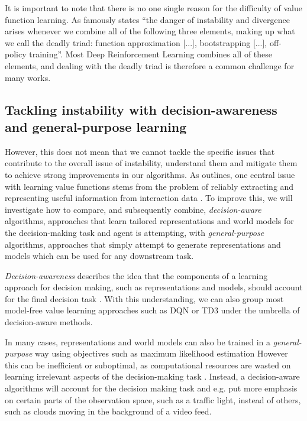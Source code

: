 It is important to note that there is no one single reason for the difficulty of value function learning.
As \textcite{suttonbook} famously states ``the danger of instability and divergence arises whenever we combine all of the following three elements, making up what we call the deadly triad: function approximation [...], bootstrapping [...], off-policy training''.
Most Deep Reinforcement Learning combines all of these elements, and dealing with the deadly triad is therefore a common challenge for many works.

\subsection{Tackling instability with decision-awareness and general-purpose learning}

However, this does not mean that we cannot tackle the specific issues that contribute to the overall issue of instability, understand them and mitigate them to achieve strong improvements in our algorithms. 
As outlines, one central issue with learning value functions stems from the problem of reliably extracting and representing useful information from interaction data \parencite{song2020observational,voelcker2022value}.
To improve this, we will investigate how to compare, and subsequently combine, \emph{decision-aware} algorithms, approaches that learn tailored representations and world models for the decision-making task and agent is attempting, with \emph{general-purpose} algorithms, approaches that simply attempt to generate representations and models which can be used for any downstream task.

\emph{Decision-awareness} describes the idea that the components of a learning approach for decision making, such as representations and models, should account for the final decision task \parencite{vaml,grimm2020value,abachi2020policy,nikishin2021control}.
With this understanding, we can also group most model-free value learning approaches such as DQN \parencite{mnih2013playing} or TD3 \parencite{fujimoto2018addressing} under the umbrella of decision-aware methods.

In many cases, representations and world models can also be trained in a \emph{general-purpose} way using objectives such as maximum likelihood estimation
However this can be inefficient or suboptimal, as computational resources are wasted on learning irrelevant aspects of the decision-making task \parencite{vaml}.
Instead, a decision-aware algorithms will account for the decision making task and e.g. put more emphasis on certain parts of the observation space, such as a traffic light, instead of others, such as clouds moving in the background of a video feed.

